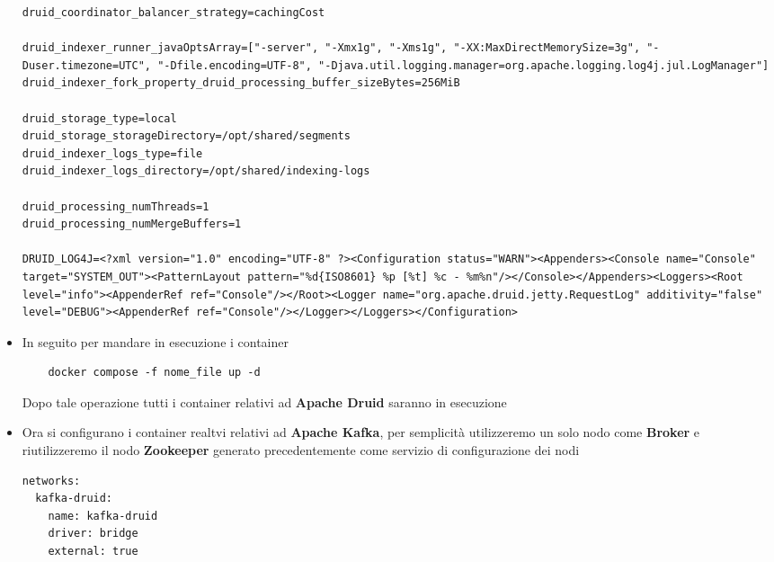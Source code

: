 \documentclass{article}
\begin{document}
\begin{itemize}
\begin{lstlisting}
druid_coordinator_balancer_strategy=cachingCost

druid_indexer_runner_javaOptsArray=["-server", "-Xmx1g", "-Xms1g", "-XX:MaxDirectMemorySize=3g", "-Duser.timezone=UTC", "-Dfile.encoding=UTF-8", "-Djava.util.logging.manager=org.apache.logging.log4j.jul.LogManager"]
druid_indexer_fork_property_druid_processing_buffer_sizeBytes=256MiB

druid_storage_type=local
druid_storage_storageDirectory=/opt/shared/segments
druid_indexer_logs_type=file
druid_indexer_logs_directory=/opt/shared/indexing-logs

druid_processing_numThreads=1
druid_processing_numMergeBuffers=1

DRUID_LOG4J=<?xml version="1.0" encoding="UTF-8" ?><Configuration status="WARN"><Appenders><Console name="Console" target="SYSTEM_OUT"><PatternLayout pattern="%d{ISO8601} %p [%t] %c - %m%n"/></Console></Appenders><Loggers><Root level="info"><AppenderRef ref="Console"/></Root><Logger name="org.apache.druid.jetty.RequestLog" additivity="false" level="DEBUG"><AppenderRef ref="Console"/></Logger></Loggers></Configuration>

\end{lstlisting}
\item In seguito per mandare in esecuzione i container  
\begin{lstlisting}
    docker compose -f nome_file up -d 
\end{lstlisting}
Dopo tale operazione tutti i container relativi ad \textbf{Apache Druid} saranno in esecuzione
\item Ora si configurano  i container realtvi relativi ad \textbf{Apache Kafka}, per semplicità utilizzeremo un solo nodo come \textbf{Broker} e riutilizzeremo il nodo \textbf{Zookeeper} generato precedentemente come servizio di configurazione dei nodi
\begin{lstlisting}[yaml]
networks:
  kafka-druid:
    name: kafka-druid
    driver: bridge
    external: true


\end{lstlisting}
\end{itemize}
\end{document}
